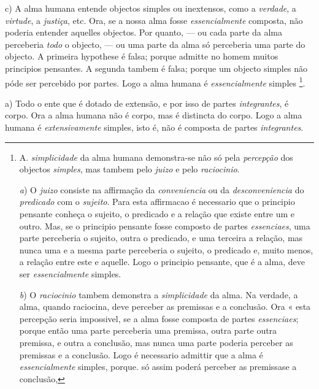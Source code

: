 c) A alma humana entende objectos simples ou inextensos, como a \emph{verdade}, a \emph{virtude}, a \emph{justiça}, etc. Ora, se a nossa alma fosse \emph{essencialmente} composta, não poderia entender aquelles objectos. Por quanto, --- ou cada parte da alma perceberia \emph{todo} o objecto, --- ou uma parte da alma só perceberia uma parte do objecto. A primeira hypothese é falsa; porque admitte no homem muitos principios pensantes. A segunda tambem é falsa; porque um objecto simples não póde ser percebido por partes. Logo a alma humana é \emph{essencialmente} simples \footnote{A. \emph{simplicidade} da alma humana demonstra-se não só pela \emph{percepção} dos objectos \emph{simples}, mas tambem pelo \emph{juizo} e pelo \emph{raciocinio}.\par \emph{a}) O \emph{juizo} consiste na affirmação da \emph{conveniencia} ou da \emph{desconveniencia} do \emph{predicado} com o \emph{sujeito}. Para esta affirmacao é necessario que o principio pensante conheça o sujeito, o predicado e a relação que existe entre um e outro. Mas, se o principio pensante fosse composto de partes \emph{essenciaes}, uma parte perceberia o sujeito, outra o predicado, e uma terceira a relação, mas nunca uma e a mesma parte perceberia o sujeito, o predicado e, muito menos, a relação entre este e aquelle. Logo o principio pensante, que é a alma, deve ser \emph{essencialmente} simples.\par \emph{b}) O \emph{raciocinio} tambem demonstra a \emph{simplicidade} da alma. Na verdade, a alma, quando raciocina, deve perceber as premissas e a conclusão. Ora « esta percepção seria impossivel, se a alma fosse composta de partes \emph{essenciaes}; porque então uma parte perceberia uma premissa, outra parte outra premissa, e outra a conclusão, mas nunca uma parte poderia perceber as premissas e a conclusão. Logo é necessario admittir que a alma é \emph{essencialmente} simples, porque. só assim poderá perceber as premissase a conclusão,}.


 

a) Todo o ente que é dotado de extensão, e por isso de   partes \emph{integrantes}, é corpo. Ora a alma humana não é corpo, mas é distincta do corpo. Logo a alma humana é \emph{extensivamente} simples, isto é, não é composta de partes \emph{integrantes}.

